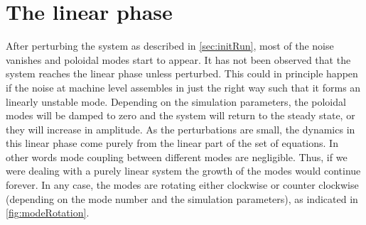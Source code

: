 \section{The linear phase}
%
After perturbing the system as described in \cref{sec:initRun}, most of the noise vanishes and poloidal modes start to appear.
It has not been observed that the system reaches the linear phase unless perturbed.
This could in principle happen if the noise at machine level assembles in just the right way such that it forms an linearly unstable mode.
Depending on the simulation parameters, the poloidal modes will be damped to zero and the system will return to the steady state, or they will increase in amplitude.
As the perturbations are small, the dynamics in this linear phase come purely from the linear part of the set of equations.
In other words mode coupling between different modes are negligible.
Thus, if we were dealing with a purely linear system the growth of the modes would continue forever.
In any case, the modes are rotating either clockwise or counter clockwise (depending on the mode number and the simulation parameters), as indicated in \cref{fig:modeRotation}.

